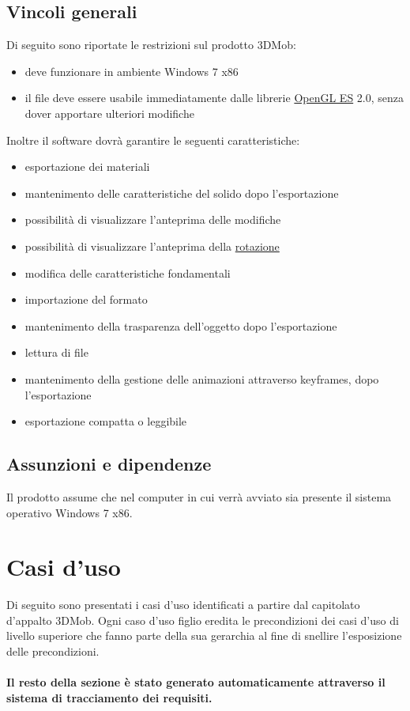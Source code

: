 \subsection{Vincoli generali}
\label{2.4}
Di seguito sono riportate le restrizioni sul prodotto 3DMob:
\begin{itemize}
\item deve funzionare in ambiente Windows 7 x86
\item il file \json{} deve essere usabile immediatamente dalle librerie \underline{OpenGL ES} 2.0, senza dover apportare ulteriori modifiche
\end{itemize}
Inoltre il software dovrà garantire le seguenti caratteristiche:
\begin{itemize}
\item esportazione dei materiali
\item mantenimento delle caratteristiche del solido dopo l'esportazione
\item possibilità di visualizzare l'anteprima delle modifiche
\item possibilità di visualizzare l'anteprima della \underline{rotazione}
\item modifica delle caratteristiche fondamentali
\item importazione del formato \obj
\item mantenimento della trasparenza dell'oggetto dopo l'esportazione
\item lettura di file \json
\item mantenimento della gestione delle animazioni attraverso keyframes, dopo l'esportazione
\item esportazione compatta o leggibile
\end{itemize}
\subsection{Assunzioni e dipendenze}
\label{2.5}
Il prodotto assume che nel computer in cui verrà avviato sia presente il sistema operativo Windows 7 x86.
\newpage





\section{Casi d'uso} %

\label{3.0}
Di seguito sono presentati i casi d'uso identificati a partire dal capitolato d'appalto 3DMob.
Ogni caso d'uso figlio eredita le precondizioni dei casi d'uso di livello superiore che fanno parte della sua gerarchia al fine di snellire l'esposizione delle precondizioni.
\\ \\
\textbf{Il resto della sezione è stato generato automaticamente attraverso il sistema di tracciamento dei requisiti.}
\\ \\

